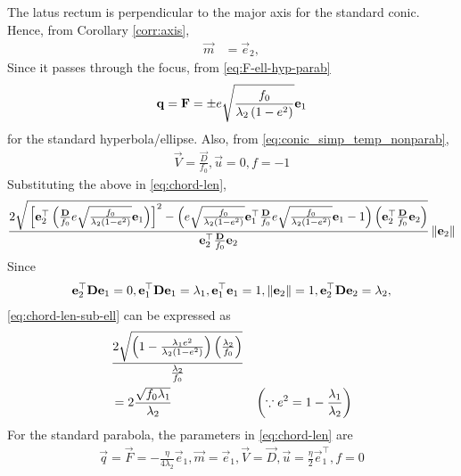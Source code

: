 \documentclass[journal,12pt,onecolumn]{IEEEtran}
\renewcommand\thesection{\arabic{section}}
\begin{document}
\begin{enumerate}[label=\thesection.\arabic*.,ref=\thesection.\theenumi]
		\section{}
		\label{app:latus}
			The latus rectum is perpendicular to the major axis for the standard conic.  Hence, from Corollary  
		\eqref{corr:axis},
  \begin{align}
  \vec{m}&= \vec{e}_2,  
\end{align}  
Since it passes through the focus, from 
					\eqref{eq:F-ell-hyp-parab}
  \begin{align}
	  \mathbf{q} =			\mathbf{F} 
=
					 \pm e\sqrt{\frac{f_0}{\lambda_2\left(1-e^2\right)}} \mathbf{e }_1
\end{align}  
for the standard hyperbola/ellipse.  Also, 
from 
    \eqref{eq:conic_simp_temp_nonparab},
  \begin{align}
	  \vec{V} =     \frac{\vec{D} }{f_0}, 
	   \vec{u} = 0, 
	   f = -1
	    \label{eq:latus_rectum_ellipse_param-new}
\end{align}  
Substituting the above in
\eqref{eq:chord-len}, 
\begin{align}
 \frac{2\sqrt{
{}\left[
\mathbf{e}_2^{\top}\left(\frac{\mathbf{D}}{f_0} e\sqrt{\frac{f_0}{\lambda_2\left(1-e^2\right)}} \mathbf{e }_1\right)
\right]^2
-
\left(
 e\sqrt{\frac{f_0}{\lambda_2\left(1-e^2\right)}} \mathbf{e }_1^{\top}\frac{\mathbf{D}}{f_0} e\sqrt{\frac{f_0}{\lambda_2\left(1-e^2\right)}} \mathbf{e }_1 -1 
\right)
\left(\mathbf{e}_2^{\top}\frac{\mathbf{D}}{f_0}\mathbf{e}_2\right)
}
}
{
\mathbf{e}_2^{\top}\frac{\mathbf{D}}{f_0}\mathbf{e}_2
}\left\lVert\mathbf{e}_2\right\rVert
\label{eq:chord-len-sub-ell}
  \end{align}
  Since 
  \begin{align}
\mathbf{e}_2^{\top}\mathbf{D}\mathbf{e}_1 = 0, 
\mathbf{e}_1^{\top}\mathbf{D}\mathbf{e}_1 = \lambda_1,
\mathbf{e}_1^{\top}\mathbf{e}_1 = 1,
	  \left\lVert\mathbf{e}_2\right\rVert = 1,
\mathbf{e}_2^{\top}\mathbf{D}\mathbf{e}_2 = \lambda_2,
  \end{align}
\eqref{eq:chord-len-sub-ell} can be expressed as 
  \begin{align}
	&		\frac{2\sqrt{\left(1-\frac{\lambda_1e^2}{{\lambda_2\left(1-e^2\right)}}\right)\left(\frac{\lambda_2}{f_0}\right)}}
{
	\frac{\lambda_2}{f_0}
	} 	
	\\
	&=		2\frac{\sqrt{
		f_0\lambda_1}}{\lambda_2}
 & \left( \because e^2 = 1-\frac{\lambda_1}{\lambda_2}\right)
		   \end{align}
For the standard parabola, the parameters in 
\eqref{eq:chord-len} are
\begin{align}  
	\vec{q} =\vec{F} =  -\frac{\eta}{4\lambda_2}\vec{e}_1, \vec{m} = \vec{e}_1, \vec{V} = \vec{D},
	\vec{u} = \frac{\eta}{2}\vec{e}_1^{\top}, f = 0
\end{align}  


\end{enumerate}
\end{document}
